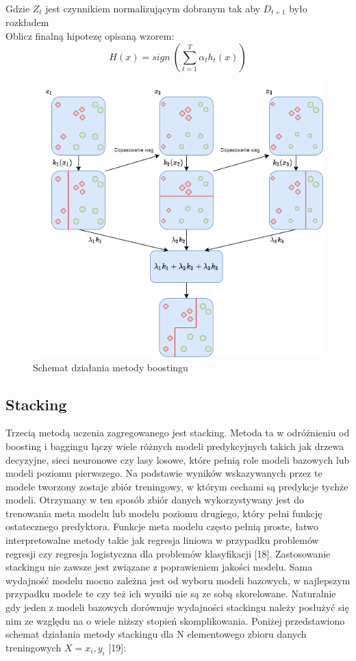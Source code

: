 \documentclass[a4paper,12pt,oneside]{book}
\begin{document}
\noindent Gdzie $Z_t$ jest czynnikiem normalizującym dobranym tak aby $D_{t+1}$ było rozkładem\\
Oblicz finalną hipotezę opisaną wzorem:
\begin{equation}
 H\left(x\right)=sign\ \left(\sum^T_{t=1}{{\alpha }_th_t\left(x\right)}\right)   
\end{equation}


\newpage{}
\begin{figure}[h]
\centering
\includegraphics[scale=0.55]{Boosting.png}
\caption{Schemat działania metody boostingu}
\end{figure}


\subsection{Stacking}

Trzecią metodą uczenia zagregowanego jest stacking. Metoda ta w odróżnieniu od boosting i baggingu łączy wiele różnych modeli predykcyjnych takich jak drzewa decyzyjne, sieci neuronowe czy lasy losowe, które pełnią role modeli bazowych lub modeli poziomu pierwszego. Na podstawie wyników wskazywanych przez te modele tworzony zostaje zbiór treningowy, w którym cechami są predykcje tychże modeli. Otrzymany w ten sposób zbiór danych wykorzystywany jest do trenowania meta modelu lub modelu poziomu drugiego, który pełni funkcję ostatecznego predyktora. Funkcje meta modelu często pełnią proste, łatwo interpretowalne metody takie jak regresja liniowa w przypadku problemów regresji czy regresja logistyczna dla problemów klasyfikacji [18]. Zastosowanie stackingu nie zawsze jest związane z poprawieniem jakości modelu. Sama wydajność modelu mocno zależna jest od wyboru modeli bazowych, w najlepszym przypadku modele te czy też ich wyniki nie są ze sobą skorelowane. Naturalnie gdy jeden z modeli bazowych dorównuje wydajności stackingu należy posłużyć się nim ze względu na o wiele niższy stopień skomplikowania. Poniżej przedstawiono schemat działania metody stackingu dla N elementowego zbioru danych treningowych $X = {x_i,y_i}$ [19]:
\end{document}
